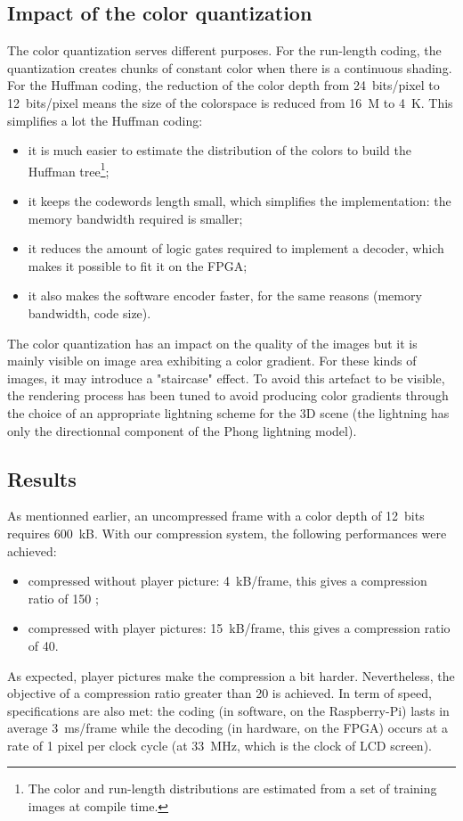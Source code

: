 \documentclass[english, DIV=13]{scrreprt}
\begin{document}
\subsection{Impact of the color quantization}

The color quantization serves different purposes. For the run-length coding,
the quantization creates chunks of constant color when there is a
continuous shading. For the Huffman
coding, the reduction of the color depth from \SI{24}{bits/pixel} to
\SI{12}{bits/pixel} means the size of the colorspace is reduced from
\SI{16}{M} to \SI{4}{K}. This simplifies a lot the Huffman coding:
\begin{itemize}
    \item it is much easier to estimate the distribution of the colors
    to build the Huffman tree\footnote{The color and run-length distributions are
    estimated from a set of training images at compile time.};
    \item it keeps the codewords length small, which simplifies the implementation:
    the memory bandwidth required is smaller;
    \item it reduces the amount of logic gates required to implement a decoder,
    which makes it possible to fit it on the FPGA;
    \item it also makes the software encoder faster, for the same reasons
    (memory bandwidth, code size).
\end{itemize}

The color quantization has an impact on the quality of the images
but it is mainly visible on image area exhibiting a color gradient.
For these kinds of images,
it may introduce a "staircase" effect. To avoid this artefact to be visible,
the rendering process has been tuned to avoid producing color gradients
through the choice of an appropriate lightning scheme for the 3D scene (the lightning
has only the directionnal component of the Phong lightning model).

\subsection{Results}
As mentionned earlier, an uncompressed frame with a color depth of \SI{12}{bits}
requires \SI{600}{kB}. With our compression system, the following performances were
achieved:
\begin{itemize}
    \item compressed without player picture: \SI{4}{kB/frame}, this gives a compression
    ratio of 150 ;
    \item compressed with player pictures: \SI{15}{kB/frame}, this gives a compression
    ratio of 40.
\end{itemize}
As expected, player pictures make the compression a bit harder. Nevertheless, the
objective of a compression ratio greater than 20 is achieved. In term of speed,
specifications are also met: the
coding (in software, on the Raspberry-Pi) lasts in average \SI{3}{ms/frame} while the
decoding (in hardware, on the FPGA) occurs at a rate of 1 pixel per clock cycle
(at \SI{33}{\mega\hertz}, which is the clock of LCD screen).
\end{document}
